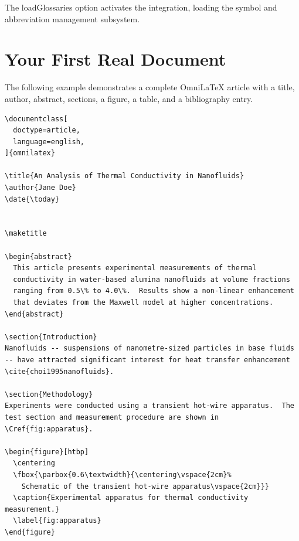 The \textsf{loadGlossaries} option activates the
 integration, loading the symbol and
abbreviation management subsystem.

\section{Your First Real Document}

The following example demonstrates a complete OmniLaTeX article with a title,
author, abstract, sections, a figure, a table, and a bibliography entry.

\begin{verbatim}
\documentclass[
  doctype=article,
  language=english,
]{omnilatex}

\title{An Analysis of Thermal Conductivity in Nanofluids}
\author{Jane Doe}
\date{\today}


\maketitle

\begin{abstract}
  This article presents experimental measurements of thermal
  conductivity in water-based alumina nanofluids at volume fractions
  ranging from 0.5\% to 4.0\%.  Results show a non-linear enhancement
  that deviates from the Maxwell model at higher concentrations.
\end{abstract}

\section{Introduction}
Nanofluids -- suspensions of nanometre-sized particles in base fluids
-- have attracted significant interest for heat transfer enhancement
\cite{choi1995nanofluids}.

\section{Methodology}
Experiments were conducted using a transient hot-wire apparatus.  The
test section and measurement procedure are shown in
\Cref{fig:apparatus}.

\begin{figure}[htbp]
  \centering
  \fbox{\parbox{0.6\textwidth}{\centering\vspace{2cm}%
    Schematic of the transient hot-wire apparatus\vspace{2cm}}}
  \caption{Experimental apparatus for thermal conductivity measurement.}
  \label{fig:apparatus}
\end{figure}


\end{verbatim}
